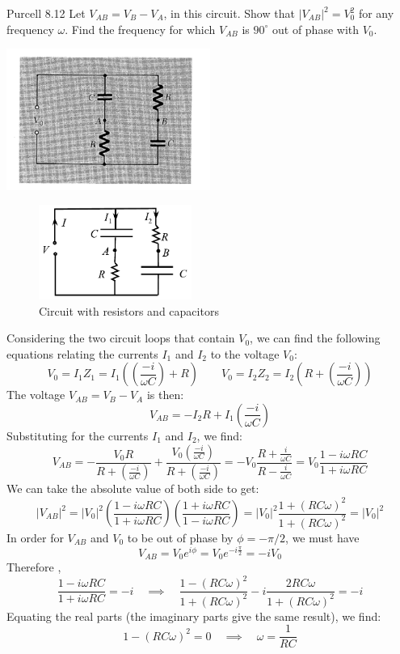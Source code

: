 \documentclass[makesolutionspdf]{esg8022pset}
\begin{document}
\begin{problem}{Purcell 8.12}
  Let $V_{AB} = V_B - V_A$, in this circuit.  Show that $|V_{AB}|^2 =
  V_0^2$ for any frequency $\omega$.  Find the frequency for which $V_{AB}$
  is $90^\circ$ out of phase with $V_0$.
  
  \begin{center}
    \includegraphics[width = 0.5\textwidth]{figpu812}
  \end{center}
\end{problem}

\begin{solution}
  \begin{figure}[H]
    \centering
    \includegraphics[width = 5cm]{Purcell812}
    \caption{Circuit with resistors and capacitors}
    \label{RCRC}
  \end{figure}
  Considering the two circuit loops that contain $V_0$, we can find
  the following equations relating the currents $I_1$ and $I_2$ to the voltage
  $V_0$:
  $$ V_0 = I_1 Z_1 = I_1\left( (\frac{-i}{\omega C}) + R\right) \qquad V_0 = I_2 Z_2  = I_2\left(R + (\frac{-i}{\omega C})\right)$$
  The voltage $V_{AB} = V_B - V_A$ is then:
  $$V_{AB} = -I_2 R + I_1( \frac{-i}{\omega C})$$
  Substituting for the currents $I_1$ and $I_2$, we find:
  $$V_{AB} = -\frac{V_0 R}{R +( \frac{-i}{\omega C})} + \frac{V_0( \frac{-i}{\omega C})}{R + (\frac{-i}{\omega
  C})} = -V_0\frac{R + \frac{i}{\omega C}}{R - \frac{i}{\omega C}} =
  V_0\frac{1 - i \omega RC}{1 + i \omega RC}$$
  We can take the absolute value of both side to get:
  $$|V_{AB}|^2 = |V_0|^2\left(\frac{1-i\omega RC}{1+i\omega RC}\right)\left(\frac{1+i\omega RC}{1-i\omega
  RC}\right) = |V_0|^2\frac{1 + (RC\omega)^2}{1 + (RC\omega)^2} =
  |V_0|^2$$
  In order for $V_{AB}$ and $V_0$ to be out of phase by $\phi =
  -{\pi}/{2}$, we must have $$V_{AB} = V_0e^{i\phi} =
  V_0e^{-i\frac{\pi}{2}} = -iV_0$$ Therefore ,
  $$\frac{1 - i \omega RC}{1 + i \omega RC} = -i \quad \implies
  \quad \frac{1- (RC\omega)^2}{1+ (RC\omega)^2} -
  i\frac{2RC\omega}{1+ (RC\omega)^2} =-i$$
  Equating the real parts (the imaginary parts give the same result),
  we find:
  $$1-(RC\omega)^2 = 0  \quad \implies \quad \omega =
  \frac{1}{RC}$$

\end{solution}
\end{document}
